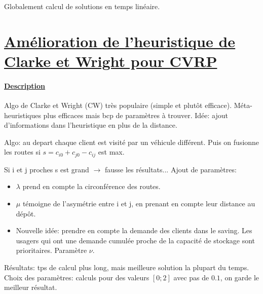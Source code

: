 \documentclass[a4paper,11pt]{report}%
\begin{document}
Globalement calcul de solutions en temps linéaire.

\newpage

\section*{\underline{Amélioration de l'heuristique de Clarke et Wright pour CVRP}}

\paragraph{\underline{Description}}
Algo de Clarke et Wright (CW) très populaire (simple et plutôt efficace). Méta-heuristiques plus efficaces mais bcp de paramètres à trouver. 
Idée: ajout d'informations dans l'heuristique en plus de la distance. 

Algo: au depart chaque client est visité par un véhicule différent. Puis on fusionne les routes si $s=c_{i0} + c_{j0} - c_{ij}$ est max. 

Si i et j proches s est grand $\rightarrow$ fausse les résultats...
Ajout de paramètres:
\begin{itemize}
\item $\lambda$ prend en compte la circonférence des routes. 
\item $\mu$ témoigne de l'asymétrie entre i et j, en prenant en compte leur distance au dépôt.
\item Nouvelle idée: prendre en compte la demande des clients dans le saving. Les usagers qui ont une demande cumulée proche de la capacité de stockage sont prioritaires. Paramètre $\nu$.
\end{itemize}

Résultats: tps de calcul plus long, mais meilleure solution la plupart du temps. Choix des paramètres: calculs pour des valeurs $[0;2]$ avec pas de $0.1$, on garde le meilleur résultat.
\end{document}
